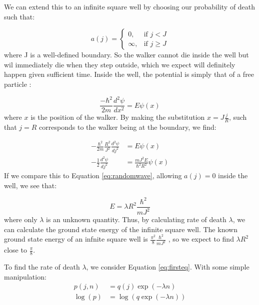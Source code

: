 \documentclass[journal]{IEEEtran}
\begin{document}
We can extend this to an infinite square well by choosing our probability of
death such that:

\begin{equation}
  \label{eq:squarewell}
    a(j) =
    \begin{cases}
      0,& \text{if } j < J\\
      \infty,& \text{if } j \geq J
    \end{cases}
    \nonumber
\end{equation}
where J is a well-defined boundary. So the walker cannot die inside the well but
wil immediately die when they step outside, which we expect will definitely
happen given sufficient time. Inside the well, the potential is simply that of a
free particle \cite{Bransden2003}:

\begin{equation}
  \frac{-\hbar^2}{2m}\frac{d^2 \psi}{dx^2} = E\psi(x)
  \nonumber
\end{equation}
where $x$ is the position of the walker. By making the substitution
$x=J\frac{j}{R}$, such that $j=R$ corresponds to the walker being at the
boundary, we find:

\begin{equation}
  \begin{split}
    -\frac{\hbar^2}{2m}\frac{R^2}{J^2}\frac{d^2\psi}{dj^2} &= E\psi(x)\\
    -\frac{1}{2}\frac{d^2\psi}{dj^2} &= \frac{mJ^2E}{\hbar^2R^2}\psi(x)
  \end{split}
  \nonumber
\end{equation}
If we compare this to Equation \ref{eq:randomwave}, allowing $a(j) = 0$ inside
the well, we see that:

\begin{equation}
  E = \lambda R^2 \frac{\hbar^2}{mJ^2}
  \nonumber
\end{equation}
where only $\lambda$ is an unknown quantity. Thus, by calculating rate of death
$\lambda$, we can calculate the ground state energy of the infinite square
well. The known ground state energy of an infnite square well is
$\frac{\pi^2}{8}\frac{\hbar^2}{mJ^2}$ \cite{Davies1998}, so we expect to find $\lambda
R^2$ close to $\frac{\pi}{8}$.

To find the rate of death $\lambda$, we consider Equation \ref{eq:firsteq}. With
some simple manipulation:
\begin{equation}
  \begin{split}
    p(j, n) & = q(j) \exp(-\lambda n)\\
    \log(p) & = \log(q \exp(-\lambda n)) \\
  \end{split}
  \nonumber
\end{equation}
\end{document}
